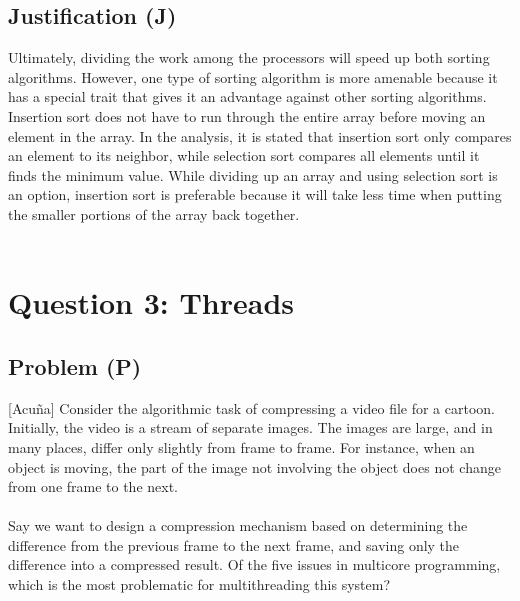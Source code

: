 \documentclass[12pt]{article}
\begin{document}
        \subsection{Justification (J)}
        Ultimately, dividing the work among the processors will speed up both sorting algorithms. However, one type of sorting 
        algorithm is more amenable because it has a special trait that gives it an advantage against other sorting algorithms. 
        Insertion sort does not have to run through the entire array before moving an element in the array. In the analysis, it 
        is stated that insertion sort only compares an element to its neighbor, while selection sort compares all elements until it 
        finds the minimum value. While dividing up an array and using selection sort is an option, insertion sort is preferable because
         it will take less time when putting the smaller portions of the array back together. \\
         \\

    \section{Question 3: Threads}
        \subsection{Problem (P)}
        [Acuña] Consider the algorithmic task of compressing a video file for a cartoon. Initially, the video is a stream of separate images. The 
        images are large, and in many places, differ only slightly from frame to frame. For instance, when an object is moving, the part of the image
        not involving the object does not change from one frame to the next. \\
        \\
        Say we want to design a compression mechanism based on determining the difference from the previous frame to the next frame, and saving only 
        the difference into a compressed result. Of the five issues in multicore programming, which is the most problematic for multithreading this system? \\
        \\
\end{document}
